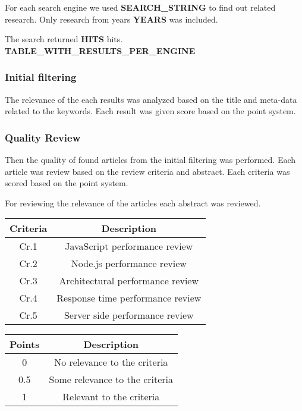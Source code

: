 For each search engine we used \textbf{SEARCH\_STRING} to find out related research.
Only research from years \textbf{YEARS} was included.

The search returned \textbf{HITS} hits.
\textbf{TABLE\_WITH\_RESULTS\_PER\_ENGINE}


\subsubsection{Initial filtering}
The relevance of the each results was analyzed based on the title and meta-data related to the keywords. Each result was given score based on the point system.

\subsubsection{Quality Review}
Then the quality of found articles from the initial filtering was performed.
Each article was review based on the review criteria and abstract.
Each criteria was scored based on the point system.

For reviewing the relevance of the articles each abstract was reviewed.

\begin{flushleft}
\begin{tabular}{|c c|} 
 \hline
 Criteria & Description \\ [0.5ex] 
 \hline
  Cr.1 & JavaScript performance review  \\ 
  \hline
  Cr.2 & Node.js performance review  \\ 
  \hline
  Cr.3 & Architectural performance review  \\ 
  \hline
  Cr.4 & Response time performance review  \\ 
  \hline
  Cr.5 & Server side performance review  \\ 
  \hline
\end{tabular}
\end{flushleft}


\begin{flushleft}
\begin{tabular}{|c c|} 
 \hline
 Points & Description \\ [0.5ex] 
 \hline
  0 & No relevance to the criteria  \\ 
 \hline
  0.5 & Some relevance to the criteria \\ 
 \hline
 1 & Relevant to the criteria \\ 
 \hline
\end{tabular}
\end{flushleft}

